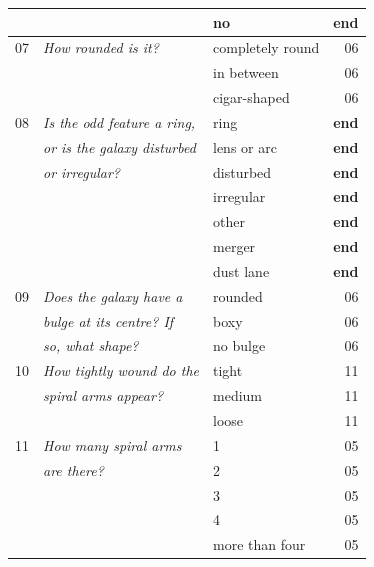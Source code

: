 \documentclass[useAMS,usenatbib]{mn2e}
\begin{document}
\begin{table}
\begin{tabular}{@{}cllr}
      & {\it                               }  & no               & {\bf end}        \\
      \hline
07    & {\it How rounded is it?            }  & completely round & 06 \\
      & {\it                               }  & in between       & 06 \\
      & {\it                               }  & cigar-shaped     & 06 \\
      \hline
08    & {\it Is the odd feature a ring,    }  & ring             & {\bf end}        \\
      & {\it or is the galaxy disturbed    }  & lens or arc      & {\bf end}        \\
      & {\it or irregular?                 }  & disturbed        & {\bf end}        \\
      & {\it                               }  & irregular        & {\bf end}        \\  
      & {\it                               }  & other            & {\bf end}        \\  
      & {\it                               }  & merger           & {\bf end}        \\  
      & {\it                               }  & dust lane        & {\bf end}        \\  
      \hline
09    & {\it Does the galaxy have a        }  & rounded          & 06 \\
      & {\it bulge at its centre? If       }  & boxy             & 06 \\
      & {\it so, what shape?               }  & no bulge         & 06 \\
      \hline
10    & {\it How tightly wound do the      }  & tight            & 11 \\
      & {\it spiral arms appear?           }  & medium           & 11 \\
      & {\it                               }  & loose            & 11 \\    
      \hline
11    & {\it How many spiral arms          }  & 1                & 05 \\
      & {\it  are there?                   }  & 2                & 05 \\
      & {\it                               }  & 3                & 05 \\
      & {\it                               }  & 4                & 05 \\
      & {\it                               }  & more than four   & 05 \\

\end{tabular}
\end{table}
\end{document}
